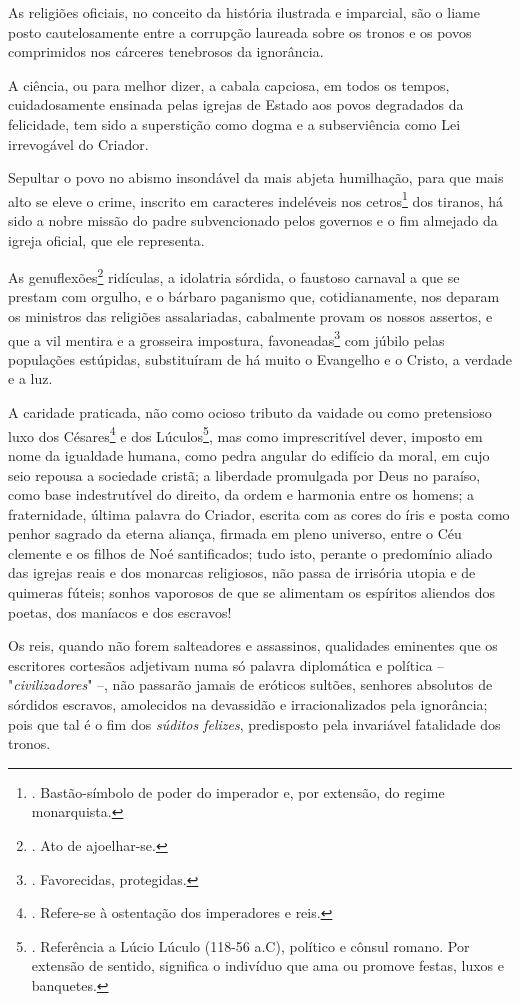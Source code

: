 As religiões oficiais, no conceito da história ilustrada e imparcial,
são o liame posto cautelosamente entre a corrupção laureada sobre os
tronos e os povos comprimidos nos cárceres tenebrosos da ignorância.

A ciência, ou para melhor dizer, a cabala capciosa, em todos os tempos,
cuidadosamente ensinada pelas igrejas de Estado aos povos degradados da
felicidade, tem sido a superstição como dogma e a subserviência como Lei
irrevogável do Criador.

Sepultar o povo no abismo insondável da mais abjeta humilhação, para que
mais alto se eleve o crime, inscrito em caracteres indeléveis nos
cetros\footnote{. Bastão-símbolo de poder do imperador e, por extensão,
  do regime monarquista.} dos tiranos, há sido a nobre missão do padre
subvencionado pelos governos e o fim almejado da igreja oficial, que ele
representa.

As genuflexões\footnote{. Ato de ajoelhar-se.} ridículas, a idolatria
sórdida, o faustoso carnaval a que se prestam com orgulho, e o bárbaro
paganismo que, cotidianamente, nos deparam os ministros das religiões
assalariadas, cabalmente provam os nossos assertos, e que a vil mentira
e a grosseira impostura, favoneadas\footnote{. Favorecidas, protegidas.}
com júbilo pelas populações estúpidas, substituíram de há muito o
Evangelho e o Cristo, a verdade e a luz.

A caridade praticada, não como ocioso tributo da vaidade ou como
pretensioso luxo dos Césares\footnote{. Refere-se à ostentação dos
  imperadores e reis.} e dos Lúculos\footnote{. Referência a Lúcio
  Lúculo (118-56 a.C), político e cônsul romano. Por extensão de
  sentido, significa o indivíduo que ama ou promove festas, luxos e
  banquetes.}, mas como imprescritível dever, imposto em nome da
igualdade humana, como pedra angular do edifício da moral, em cujo seio
repousa a sociedade cristã; a liberdade promulgada por Deus no paraíso,
como base indestrutível do direito, da ordem e harmonia entre os homens;
a fraternidade, última palavra do Criador, escrita com as cores do íris
e posta como penhor sagrado da eterna aliança, firmada em pleno
universo, entre o Céu clemente e os filhos de Noé santificados; tudo
isto, perante o predomínio aliado das igrejas reais e dos monarcas
religiosos, não passa de irrisória utopia e de quimeras fúteis; sonhos
vaporosos de que se alimentam os espíritos aliendos dos poetas, dos
maníacos e dos escravos!

Os reis, quando não forem salteadores e assassinos, qualidades eminentes
que os escritores cortesãos adjetivam numa só palavra diplomática e
política -- "\emph{civilizadores}" --, não passarão jamais de eróticos
sultões, senhores absolutos de sórdidos escravos, amolecidos na
devassidão e irracionalizados pela ignorância; pois que tal é o fim dos
\emph{súditos felizes}, predisposto pela invariável fatalidade dos
tronos.

